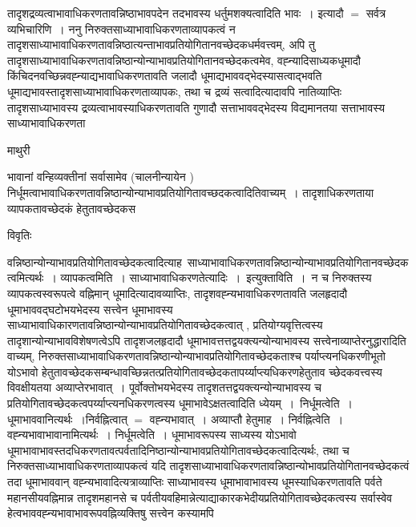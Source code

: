 \documentclass[10pt, openany]{book}
\begin{document}
{तादृशद्रव्यत्वाभावाधिकरणतावन्निष्ठाभावपदेन तदभावस्य धर्तुमशक्यत्वादिति भावः~। इत्यादौ $=$ सर्वत्र व्यभिचारिणि~। ननु निरुक्तसाध्याभावाधिकरणताव्यापकत्वं न तादृशसाध्याभावाधिकरणतावन्निष्ठात्यन्ताभावप्रतियोगितानवच्छेदकधर्मवत्त्वम्, अपि तु तादृशसाध्याभावाधिकरणतावन्निष्ठान्योन्याभावप्रतियोगितानवच्छेदकत्वमेव, वह्न्यादिसाध्यकधूमादौ किंचिदनवच्छिन्नवह्न्याद्यभावाधिकरणतावति जलादौ धूमाद्यभाववद्भेदस्यासत्वाद्भवति धूमाद्यभावस्तादृशसाध्याभावाधिकरणताव्यापकः, तथा च द्रव्यं सत्वादित्यादावपि नातिव्याप्तिः तादृशसाध्याभावस्य द्रव्यत्वाभावस्याधिकरणतावति गुणादौ सत्ताभाववद्भेदस्य विद्यमानतया सत्ताभावस्य साध्याभावाधिकरणता
\newpage
\begin{center}  माथुरी  \end{center} 
{\la भावानां वन्हिव्यक्तीनां सर्वासामेव (चालनीन्यायेन ) निर्धूमत्वाभावाधिकरणतावन्निष्ठान्योन्याभावप्रतियोगितावच्छदकत्वादितिवाच्यम्~। तादृशाधिकरणताया व्यापकतावच्छेदकं हेतुतावच्छेदकस}
\begin{center}     विवृतिः \end{center}
वन्निष्ठान्योन्याभावप्रतियोगितावच्छेदकत्वादित्याह~साध्याभावाधिकरणतावन्निष्ठान्योन्याभावप्रतियोगितानवच्छेदकत्वमित्यर्थः~। व्यापकत्वमिति~। साध्याभावाधिकरणतेत्यादिः~।~{\qt इत्युक्ताविति~।}~न च निरुक्तस्य
व्यापकत्वस्वरूपत्वे वह्निमान् धूमादित्यादावव्याप्तिः, तादृशवह्न्यभावाधिकरणतावति जलहृदादौ धूमाभाववद्घटोभयभेदस्य सत्त्वेन धूमाभावस्य साध्याभावाधिकारणतावन्निष्ठान्योन्याभावप्रतियोगितावच्छेदकत्वात् , प्रतियोग्यवृत्तित्वस्य तादृशान्योन्याभावविशेषणत्वेऽपि तादृशजलहृदादौ
धूमाभावत्तत्तद्वयक्त्यन्योन्याभावस्य सत्त्वेनाव्याप्तेरनुद्धारादिति वाच्यम्, निरुक्तसाध्याभावाधिकरणतावन्निष्ठान्योन्याभावप्रतियोगितावच्छेदकताश्च 
पर्याप्त्यनधिकरणीभूतो योऽभावो    हेतुतावच्छेदकसम्बन्धावच्छिन्नतत्प्रतियोगितावच्छेदकतापर्य्याप्त्यधिकरणहेतुताव च्छेदकवत्त्वस्य विवक्षीयतया अव्याप्तेरभावात्~। पूर्वोक्तोभयभेदस्य तादृशतत्तद्वयक्त्यन्योन्याभावस्य च प्रतियोगितावच्छेदकत्वपर्य्याप्त्यनधिकरणत्वस्य धूमाभावेऽक्षतत्वादिति ध्येयम्~।~{\la निर्धूमत्वेति~।} धूमाभाववानित्यर्थः~।निर्वह्नित्वात् $=$ वह्न्यभावात्~। अव्याप्तौ हेतुमाह~। निर्वह्नित्वेति~। वह्न्यभावाभावानामित्यर्थः~। {\la निर्धूमत्वेति~।} धूमाभावरूपस्य साध्यस्य योऽभावो धूमाभावाभावस्तदधिकरणतावत्पर्वतादिनिष्ठान्योन्याभावप्रतियोगितावच्छेदकत्वादित्यर्थः, तथा च निरुक्तसाध्याभावाधिकरणताव्यापकत्वं यदि तादृशसाध्याभावाधिकरणतावन्निष्ठान्योभावप्रतियोगितानवच्छेदकत्वं तदा धूमाभाववान् वह्न्यभावादित्यत्राव्याप्तिः साध्याभावस्य धूमाभावाभावस्य धूमस्याधिकरणतावति पर्वते महानसीयवह्निमान्न तादृशमहानसे च पर्वतीयवहिमान्नेत्याद्याकारकभेदीयप्रतियोगितावच्छेदकत्वस्य सर्वास्वेव हेत्वभाववह्न्यभावाभावरूपवह्निव्यक्तिषु सत्त्वेन कस्यामपि
}
\end{document}

